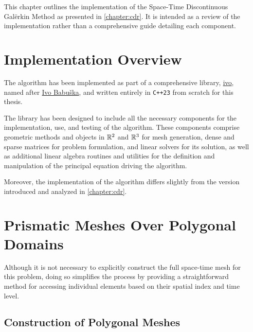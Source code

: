 This chapter outlines the implementation of the Space-Time Discontinuous Galërkin Method as presented in \cref{chapter:cdr}. It is intended as a review of the implementation rather than a comprehensive guide detailing each component.

\section{Implementation Overview}

The algorithm has been implemented as part of a comprehensive library, \href{https://github.com/diantonioandrea/ivo}{ivo}, named after \href{https://en.wikipedia.org/wiki/Ivo_Babuška}{Ivo Babuška}, and written entirely in \lstinline{C++23} from scratch for this thesis.

The library has been designed to include all the necessary components for the implementation, use, and testing of the algorithm. These components comprise geometric methods and objects in $\mathbb{R}^{2}$ and $\mathbb{R}^{3}$ for mesh generation, dense and sparse matrices for problem formulation, and linear solvers for its solution, as well as additional linear algebra routines and utilities for the definition and manipulation of the principal equation driving the algorithm.

Moreover, the implementation of the algorithm differs slightly from the version introduced and analyzed in \cref{chapter:cdr}.

\newpage
\section{Prismatic Meshes Over Polygonal Domains} \label{section:mesh}

Although it is not necessary to explicitly construct the full space-time mesh for this problem, doing so simplifies the process by providing a straightforward method for accessing individual elements based on their spatial index and time level. 

\subsection{Construction of Polygonal Meshes} \label{subsection:pol_mesh}

%         
%         


